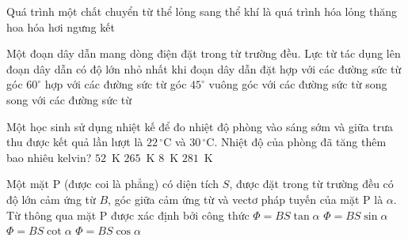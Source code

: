 	\begin{ex}%
		Quá trình một chất chuyển từ thể lỏng sang thể khí là quá trình
		\choice
		{hóa lỏng}
		{thăng hoa}
		{\True hóa hơi}
		{ngưng kết}
	\end{ex}

	\begin{ex}%
		Một đoạn dây dẫn mang dòng điện đặt trong từ trường đều. Lực từ tác dụng lên đoạn dây dẫn có độ lớn nhỏ nhất khi đoạn dây dẫn đặt
		\choice
		{hợp với các đường sức từ góc $60^\circ$}
		{hợp với các đường sức từ góc $45^\circ$}
		{vuông góc với các đường sức từ}
		{\True song song với các đường sức từ}
	\end{ex}

	\begin{ex}%
		Một học sinh sử dụng nhiệt kế để đo nhiệt độ phòng vào sáng sớm và giữa trưa thu được kết quả lần lượt là $22\,^\circ\text{C}$ và $30\,^\circ\text{C}$. Nhiệt độ của phòng đã tăng thêm bao nhiêu kelvin?
		\choice
		{$52$~K}
		{$265$~K}
		{\True $8$~K}
		{$281$~K}
	\end{ex}

	\begin{ex}%
		Một mặt P (được coi là phẳng) có diện tích $S$, được đặt trong từ trường đều có độ lớn cảm ứng từ $B$, góc giữa cảm ứng từ và vectơ pháp tuyến của mặt P là $\alpha$. Từ thông qua mặt P được xác định bởi công thức
		\choice
		{$\Phi=BS\tan\alpha$}
		{$\Phi=BS\sin\alpha$}
		{$\Phi=BS\cot\alpha$}
		{\True $\Phi=BS\cos\alpha$}
	\end{ex}

